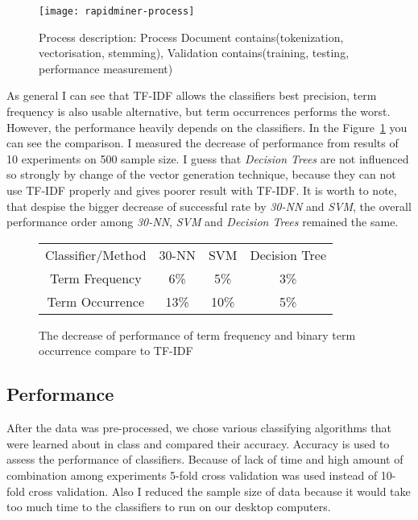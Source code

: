 \begin{figure}
\begin{center} 
\texttt{[image: rapidminer-process]}
\caption{Process description: Process Document contains(tokenization, vectorisation, stemming), Validation contains(training, testing, performance measurement)}
\end{center}
\end{figure}
As general I can see that TF-IDF allows the classifiers best precision, term frequency is also usable alternative, but term occurrences performs the worst.
However, the performance heavily depends on the classifiers.
In the Figure~\ref{fig:vectors} you can see the comparison. 
I measured the decrease of performance from results of 10 experiments on 500 sample size.
I guess that {\it Decision Trees} are not influenced so strongly by change of the vector generation
technique, because they can not use TF-IDF properly and gives poorer result with TF-IDF.
It is worth to note, that despise the bigger decrease of successful rate by {\it 30-NN} and {\it SVM},
the overall performance order among {\it 30-NN}, {\it SVM} and {\it Decision Trees} remained the same.
\begin{figure}
\begin{center}
\begin{tabular}{|c|c|c|c|}
\hline
Classifier/Method     & 30-NN  & SVM &  Decision Tree   \\
Term Frequency        & 6\%    & 5\% &    3\%  \\
Term Occurrence       & 13\%   & 10\% &   5\%  \\
\hline
\end{tabular}
\caption{\label{fig:vectors} The decrease of performance of term frequency and binary term occurrence compare to TF-IDF}
\end{center}
\end{figure}

\subsection*{Performance} %
\label{sub:Performance}
 After the data was pre-processed, we chose various classifying algorithms that were learned about in class and compared their accuracy. Accuracy is used to assess the performance of classifiers. Because of lack of time and high amount of combination among experiments 5-fold cross validation was used instead of 10-fold cross validation. Also I reduced the sample size of data because it would take too much time to the classifiers to run on our desktop computers.

